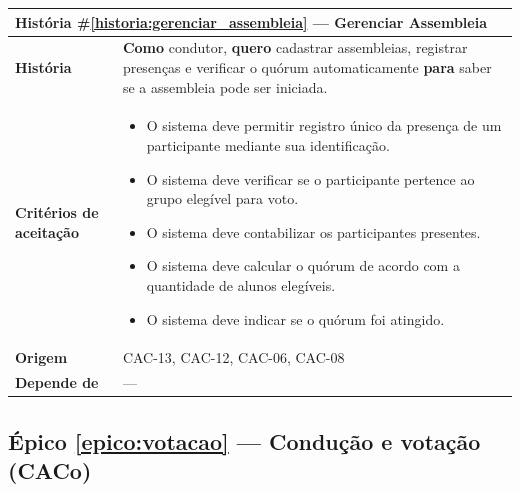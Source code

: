 \documentclass[12pt,a4paper]{article}
\newcounter{epico}
\newcounter{historia}
\begin{document}
\begin{table}[H]
    \centering
    \begin{tabular}{|m{4.5cm} | m{11cm}|}
    \hline
    
    \multicolumn{2}{|l|}{\textbf{História \#\ref{historia:gerenciar_assembleia} --- Gerenciar Assembleia}} \\
    
    \hline  \textbf{História} &
    \textbf{Como} condutor, \newline
    \textbf{quero} cadastrar assembleias, registrar presenças e verificar o quórum automaticamente \newline  
    \textbf{para} saber se a assembleia pode ser iniciada. \\
    
    \textbf{Critérios de aceitação} &
    \begin{itemize}
        \item{O sistema deve permitir registro único da presença de um participante mediante sua identificação.}
        \item{O sistema deve verificar se o participante pertence ao grupo elegível para voto.}
        \item{O sistema deve contabilizar os participantes presentes.}
        \item{O sistema deve calcular o quórum de acordo com a quantidade de alunos elegíveis.}
        \item{O sistema deve indicar se o quórum foi atingido.}
    \end{itemize}\\
    
    \textbf{Origem} &
    CAC-13, CAC-12, CAC-06, CAC-08 \\
    
    \textbf{Depende de} &
    --- \\
    
    \hline
    \end{tabular}
\end{table}

\label{epico:votacao}
\subsection*{Épico \ref{epico:votacao} --- Condução e votação (CACo)}
\end{document}
